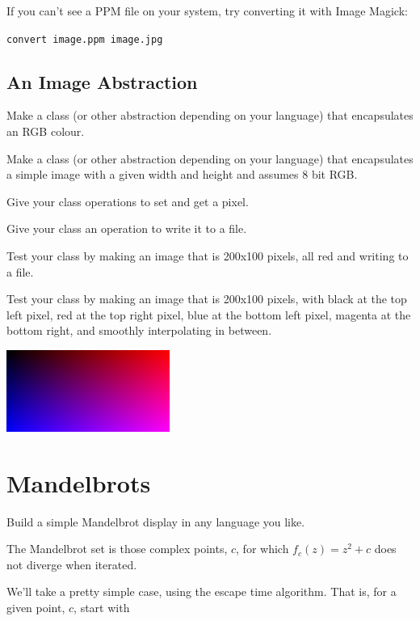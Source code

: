 \documentclass{article}
\begin{document}
        If you can't see a PPM file on your system, try converting it with Image Magick:
        \begin{centering}
            \texttt{convert image.ppm image.jpg}
        \end{centering}
        
        \subsection{An Image Abstraction}
            Make a class (or other abstraction depending on your language) that encapsulates an RGB colour.
        
            Make a class (or other abstraction depending on your language) that encapsulates a simple image with a given width and height 
            and assumes 8 bit RGB.
            
            Give your class operations to set and get a pixel.
            
            Give your class an operation to write it to a file.

            Test your class by making an image that is 200x100 pixels, all red and writing to a file. 

            Test your class by making an image that is 200x100 pixels, with black at the top left pixel, red at the top right pixel,
            blue at the bottom left pixel, magenta at the bottom right, and smoothly interpolating in between.
    
            \begin{center}
                \includegraphics[width=0.4\textwidth]{smooth}
            \end{center}
    
    \section{Mandelbrots}
        Build a simple Mandelbrot display in any language you like.
        
        The Mandelbrot set is those complex points, $c$, for which $f_c(z)=z^2+c$ does not diverge when iterated.
        
        We'll take a pretty simple case, using the escape time algorithm.  That is, for a given point, $c$, start with 
        
\end{document}
